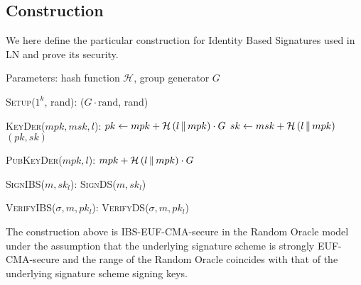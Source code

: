  \subsection{Construction}
    We here define the particular construction for Identity Based Signatures
    used in LN and prove its security.

    Parameters: hash function $\mathcal{H}$, group generator $G$
    \begin{algorithmic}[0]
      \State \textsc{Setup}($1^k$, rand):
      \Indent
        \State \Return ($G \cdot \mathrm{rand}$, rand)
      \EndIndent
    \end{algorithmic}

    \begin{algorithmic}[0]
      \State \textsc{KeyDer}($mpk, msk, l$):
      \Indent
        \State $pk \gets mpk + \mathcal{H}\left(l \,\|\, mpk\right) \cdot G$
        \State $sk \gets msk + \mathcal{H}\left(l \,\|\, mpk\right)$
        \State \Return $(pk, sk)$
      \EndIndent
    \end{algorithmic}

    \begin{algorithmic}[0]
      \State \textsc{PubKeyDer}($mpk, l$):
      \Indent
        \State \Return $mpk + \mathcal{H}\left(l \,\|\, mpk\right) \cdot G$
      \EndIndent
    \end{algorithmic}

    \begin{algorithmic}[0]
      \State \textsc{SignIBS}($m, sk_l$):
      \Indent
        \State \Return \textsc{SignDS}($m, sk_l$)
      \EndIndent
    \end{algorithmic}

    \begin{algorithmic}[0]
      \State \textsc{VerifyIBS}($\sigma, m, pk_l$):
      \Indent
        \State \Return \textsc{VerifyDS}($\sigma, m, pk_l$)
      \EndIndent
    \end{algorithmic}

    \begin{lemma}
      \label{lemma:ibs}
      The construction above is \textsf{IBS-EUF-CMA}-secure in the Random Oracle
      model under the assumption that the underlying signature scheme is
      strongly \textsf{EUF-CMA}-secure and the range of the Random Oracle
      coincides with that of the underlying signature scheme signing keys.
    \end{lemma}

